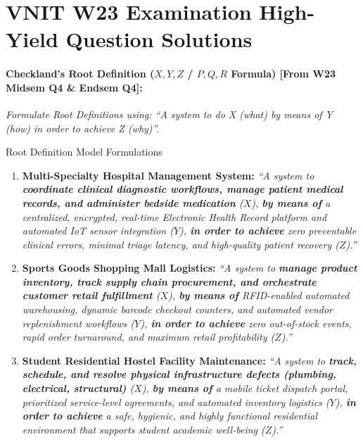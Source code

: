 \section{VNIT W23 Examination High-Yield Question Solutions}
\label{sec:w23_solutions}

\paragraph{Checkland's Root Definition ($X, Y, Z$ / $P, Q, R$ Formula) [From W23 Midsem Q4 \& Endsem Q4]:}
\textit{Formulate Root Definitions using: ``A system to do X (what) by means of Y (how) in order to achieve Z (why)''.}

\begin{examplebox}{Root Definition Model Formulations}
\begin{enumerate}[leftmargin=1.5em, itemsep=3pt]
    \item \textbf{Multi-Specialty Hospital Management System:}
    \textit{``A system to \textbf{coordinate clinical diagnostic workflows, manage patient medical records, and administer bedside medication} ($X$), \textbf{by means of} a centralized, encrypted, real-time Electronic Health Record platform and automated IoT sensor integration ($Y$), \textbf{in order to achieve} zero preventable clinical errors, minimal triage latency, and high-quality patient recovery ($Z$).''}
    \item \textbf{Sports Goods Shopping Mall Logistics:}
    \textit{``A system to \textbf{manage product inventory, track supply chain procurement, and orchestrate customer retail fulfillment} ($X$), \textbf{by means of} RFID-enabled automated warehousing, dynamic barcode checkout counters, and automated vendor replenishment workflows ($Y$), \textbf{in order to achieve} zero out-of-stock events, rapid order turnaround, and maximum retail profitability ($Z$).''}
    \item \textbf{Student Residential Hostel Facility Maintenance:}
    \textit{``A system to \textbf{track, schedule, and resolve physical infrastructure defects (plumbing, electrical, structural)} ($X$), \textbf{by means of} a mobile ticket dispatch portal, prioritized service-level agreements, and automated inventory logistics ($Y$), \textbf{in order to achieve} a safe, hygienic, and highly functional residential environment that supports student academic well-being ($Z$).''}
\end{enumerate}
\end{examplebox}

